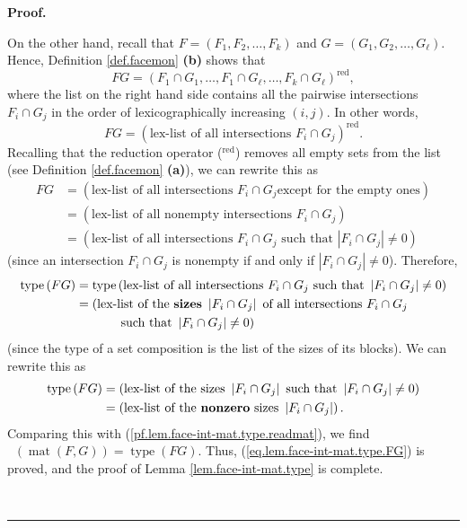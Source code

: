 \documentclass[12pt]{article}
\theoremstyle{definition}%
\theoremstyle{definition}%
\theoremstyle{remark}%
\newcommand{\readb}{\mathop{\overline{\operatorname{read}}}}
\newcommand{\mat}{\operatorname{mat}}
\newcommand{\red}{\operatorname{red}}
\newcommand{\type}{\operatorname{type}}
\newenvironment{proof}[1][Proof]{\noindent\textbf{#1.} }{\ \rule{0.5em}{0.5em}}
\begin{document}
\begin{proof}
\begin{enumerate}
On the other hand, recall that $F=\left(  F_{1},F_{2},\ldots,F_{k}\right)  $
and $G=\left(  G_{1},G_{2},\ldots,G_{\ell}\right)  $. Hence, Definition
\ref{def.facemon} \textbf{(b)} shows that
\[
FG=\left(  F_{1}\cap G_{1},\dots,F_{1}\cap G_{\ell},\dots,F_{k}\cap G_{\ell
}\right)  ^{\red},
\]
where the list on the right hand side contains all the pairwise intersections
$F_{i}\cap G_{j}$ in the order of lexicographically increasing $\left(
i,j\right)  $. In other words,
\[
FG=\left(  \text{lex-list of all intersections }F_{i}\cap G_{j}\right)
^{\red}.
\]
Recalling that the reduction operator ($^{\operatorname*{red}}$) removes all
empty sets from the list (see Definition \ref{def.facemon} \textbf{(a)}), we
can rewrite this as
\begin{align*}
FG  &  =\left(  \text{lex-list of all intersections }F_{i}\cap G_{j}\text{
except for the empty ones}\right) \\
&  =\left(  \text{lex-list of all nonempty intersections }F_{i}\cap
G_{j}\right) \\
&  =\left(  \text{lex-list of all intersections }F_{i}\cap G_{j}\text{ such
that }\left\vert F_{i}\cap G_{j}\right\vert \neq0\right)
\end{align*}
(since an intersection $F_{i}\cap G_{j}$ is nonempty if and only if
$\left\vert F_{i}\cap G_{j}\right\vert \neq0$). Therefore,
\begin{align*}
\type \left(  FG\right)   &  =\type \left(
\text{lex-list of all intersections }F_{i}\cap G_{j}\text{ such that
}\left\vert F_{i}\cap G_{j}\right\vert \neq0\right) \\
&  =\left(  \text{lex-list of the \textbf{sizes} }\left\vert F_{i}\cap
G_{j}\right\vert \text{ of all intersections }F_{i}\cap G_{j}\right. \\
&  \ \ \ \ \ \ \ \ \ \ \left.  \text{such that }\left\vert F_{i}\cap
G_{j}\right\vert \neq0\right)
\end{align*}
(since the type of a set composition is the list of the sizes of its blocks).
We can rewrite this as
\begin{align*}
\type \left(  FG\right)   &  =\left(  \text{lex-list of the
sizes }\left\vert F_{i}\cap G_{j}\right\vert \text{ such that }\left\vert
F_{i}\cap G_{j}\right\vert \neq0\right) \\
&  =\left(  \text{lex-list of the \textbf{nonzero} sizes }\left\vert F_{i}\cap
G_{j}\right\vert \right)  .
\end{align*}
Comparing this with (\ref{pf.lem.face-int-mat.type.readmat}), we find
$\readb \left(  \mat\left(  F,G\right)
\right)  =\type \left(  FG\right)  $. Thus,
(\ref{eq.lem.face-int-mat.type.FG}) is proved, and the proof of Lemma
\ref{lem.face-int-mat.type} is complete. \qedhere

\end{enumerate}
\end{proof}
\end{document}
